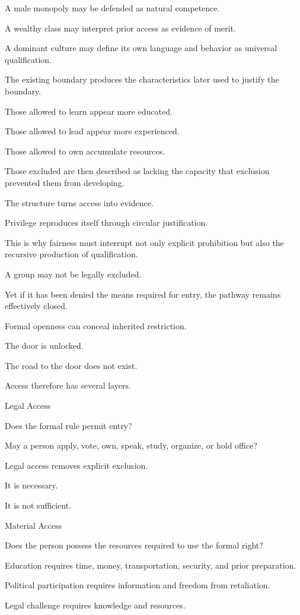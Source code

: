 A male monopoly may be defended as natural competence.

A wealthy class may interpret prior access as evidence of merit.

A dominant culture may define its own language and behavior as universal qualification.

The existing boundary produces the characteristics later used to justify the boundary.

Those allowed to learn appear more educated.

Those allowed to lead appear more experienced.

Those allowed to own accumulate resources.

Those excluded are then described as lacking the capacity that exclusion prevented them from developing.

The structure turns access into evidence.

Privilege reproduces itself through circular justification.

This is why fairness must interrupt not only explicit prohibition but also the recursive production of qualification.

A group may not be legally excluded.

Yet if it has been denied the means required for entry, the pathway remains effectively closed.

Formal openness can conceal inherited restriction.

The door is unlocked.

The road to the door does not exist.

Access therefore has several layers.

Legal Access

Does the formal rule permit entry?

May a person apply, vote, own, speak, study, organize, or hold office?

Legal access removes explicit exclusion.

It is necessary.

It is not sufficient.

Material Access

Does the person possess the resources required to use the formal right?

Education requires time, money, transportation, security, and prior preparation.

Political participation requires information and freedom from retaliation.

Legal challenge requires knowledge and resources.

